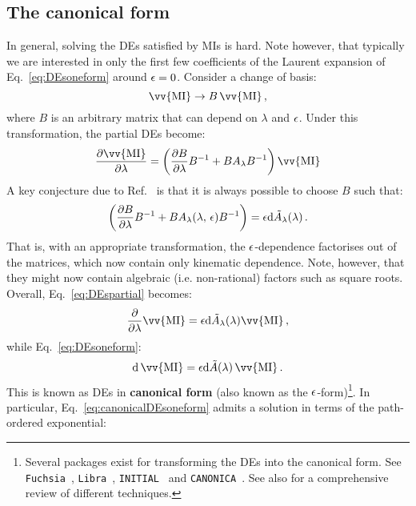 \documentclass[main.tex]{subfiles}
\begin{document}
\subsection{The canonical form} \label{sec:canonicalform}
In general, solving the DEs satisfied by MIs is hard. Note however, that typically we are interested in only the first few coefficients of the Laurent expansion of Eq.~\ref{eq:DEsoneform} around $\epsilon=0$. Consider a change of basis:
\begin{equation} \label{eq:basistransformation}
    \vv{\text{MI}} \rightarrow B\,\vv{\text{MI}}\,,
\end{equation}
where $B$ is an arbitrary matrix that can depend on $\lambda$ and $\epsilon$. Under this transformation, the partial DEs become:
\begin{equation}
    \frac{\partial \vv{\text{MI}}}{\partial \lambda} = \left( \frac{\partial B}{\partial \lambda}B^{-1} + B A_{\lambda} B^{-1} \right) \vv{\text{MI}}
\end{equation}
A key conjecture due to Ref.~\cite{Henn:2013pwa} is that it is always possible to choose $B$ such that:
\begin{equation}
    \left( \frac{\partial B}{\partial \lambda}B^{-1} + B A_{\lambda}(\lambda, \, \epsilon) B^{-1} \right) = \epsilon \mathrm{d} \tilde{A}_{\lambda}(\lambda)\,.
\end{equation}
That is, with an appropriate transformation, the $\epsilon$-dependence factorises out of the matrices, which now contain only kinematic dependence. Note, however, that they might now contain algebraic (i.e. non-rational) factors such as square roots. Overall, Eq.~\ref{eq:DEspartial} becomes:
\begin{equation} \label{eq:canonicalDEspartial}
    \frac{\partial}{\partial \lambda} \vv{\text{MI}} = \eps\dd \tilde{A}_{\lambda}(\lambda) \vv{\text{MI}}\,, 
\end{equation}
while Eq.~\ref{eq:DEsoneform}:
\begin{equation} \label{eq:canonicalDEsoneform}
    \dd \,\vv{\text{MI}} = \eps \dd \tilde{A}(\lambda) \,\vv{\text{MI}}\,.
\end{equation}
This is known as DEs in \textbf{canonical form} (also known as the $\epsilon$-form)\footnote{Several packages exist for transforming the DEs into the canonical form. See \texttt{Fuchsia}~\cite{Gituliar:2017vzm}, \texttt{Libra}~\cite{Lee:2020zfb}, \texttt{INITIAL}~\cite{Dlapa:2020cwj} and \texttt{CANONICA}~\cite{Meyer:2018feh}. See also \cite{Dlapa:2022nct} for a comprehensive review of different techniques.}. In particular, Eq.~\ref{eq:canonicalDEsoneform} admits a solution in terms of the path-ordered exponential:
\end{document}
